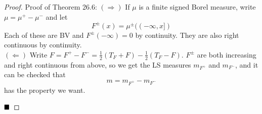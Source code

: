 \begin{proof}{Proof of Theorem 26.6:}
    $(\Rightarrow)$ If $\mu$ is a finite signed Borel measure, write $\mu = \mu^{+} - \mu^{-}$ and let
    \[ F^{\pm}(x) = \mu^{\pm}((-\infty, x]) \]
    Each of these are BV and $F^{\pm}(-\infty) = 0$ by continuity. They are also right continuous by continuity.\\

    $(\Leftarrow)$ Write $F = F^{+} - F^{-} = \frac{1}{2}(T_F + F) - \frac{1}{2}(T_F - F)$. $F^{\pm}$ are both increasing and right continuous from above, so we get the LS measures $m_{F^{+}}$ and $m_{F^{-}}$, and it can be checked that
    \[ m = m_{F^{+}} - m_{F^{-}} \]
    has the property we want.

    $\qed$
\end{proof}
